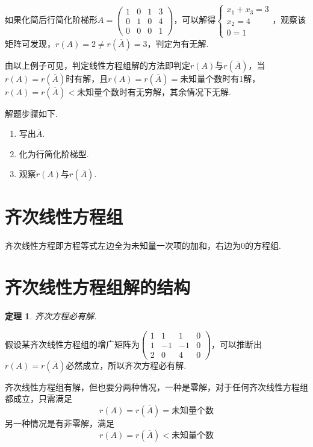 \documentclass[12pt, a4paper, oneside]{ctexbook}
\newtheorem{theorem}{定理}[section]
\begin{document}
如果化简后行简化阶梯形$A=\left ( \begin{array}{ccc|c}
    1 & 0 & 1 & 3 \\
    0 & 1 & 0 & 4 \\
    0 & 0 & 0 & 1
\end{array} \right )$，可以解得$\begin{cases}
    x_1 + x_3 = 3 \\
    x_2 = 4 \\
    0 = 1
\end{cases}$，观察该矩阵可发现，$r(A)=2 \neq r(\overline{A})=3$，判定为有无解. 


由以上例子可见，判定线性方程组解的方法即判定$r(A)$与$r(\overline{A})$，当$r(A) = r(\overline{A})$时有解，且$r(A) = r(\overline{A}) = \mbox{未知量个数}$时有1解，$r(A) = r(\overline{A}) < \mbox{未知量个数}$时有无穷解，其余情况下无解. 

解题步骤如下.
\begin{enumerate}
    \item 写出$\overline{A}$. 
    \item 化为行简化阶梯型. 
    \item 观察$r(A)$与$r(\overline{A})$. 
\end{enumerate}

\section{齐次线性方程组}

齐次线性方程即方程等式左边全为未知量一次项的加和，右边为0的方程组. 

\section{齐次线性方程组解的结构}

\begin{theorem}
    齐次方程必有解. 
\end{theorem}

假设某齐次线性方程组的增广矩阵为$\left ( \begin{array}{ccc|c}
    1 & 1 & 1 & 0 \\
    1 & -1 & -1 & 0 \\
    2 & 0 & 4 & 0
\end{array} \right )$，可以推断出$r(A) = r(\overline{A})$必然成立，所以齐次方程必有解. 

齐次线性方程组有解，但也要分两种情况，一种是零解，对于任何齐次线性方程组都成立，只需满足
$$r(A) = r(\overline{A}) = \mbox{未知量个数}$$
另一种情况是有非零解，满足
$$r(A) = r(\overline{A}) < \mbox{未知量个数}$$
\end{document}
